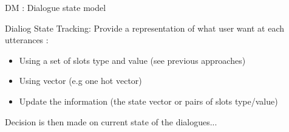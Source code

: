 \documentclass[10pt,aspectratio=169]{beamer}
\begin{document}
\begin{frame}
\begin{columns}
\begin{column}{0.4\textwidth}
\begin{figure}
            \end{figure}
        \end{column}
    \end{columns}


\end{frame}
\begin{frame}{DM : Dialogue state model}
    \begin{block}{Dialiog State Tracking:}
        Provide a representation of what user want  at each utterances \cite{henderson-2015-machine} : 
        \begin{itemize}
            \item Using a set of slots type and value (see previous approaches)
            \item Using vector (e.g one hot vector) \cite{baud-2023-repondre}%
            \item Update the information (the state vector or pairs of slots type/value)
        \end{itemize}
        Decision is then made on current state of the dialogues... 
    \end{block}
\end{frame}
\end{document}

